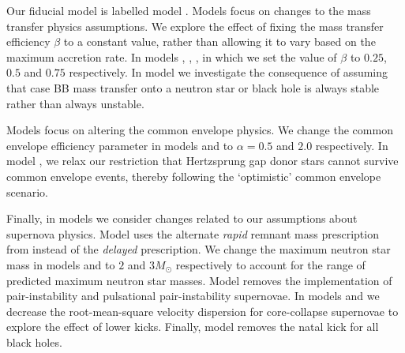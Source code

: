 Our fiducial model is labelled model \modFid{}. Models \modRangeMT{} focus on changes to the mass transfer physics assumptions. We explore the effect of fixing the mass transfer efficiency $\beta$ to a constant value, rather than allowing it to vary based on the maximum accretion rate. In models \modBetaLow{}, \modBetaMed{}, \modBetaHigh{}, in which we set the value of $\beta$ to $0.25$, $0.5$ and $0.75$ respectively. In model \modCaseBB{} we investigate the consequence of assuming that case BB mass transfer onto a neutron star or black hole is always stable rather than always unstable.

Models \modRangeCE{} focus on altering the common envelope physics. We change the common envelope efficiency parameter in models \modAlphaLow{} and \modAlphaHigh{} to $\alpha = 0.5$ and $2.0$ respectively. In model \modOpt, we relax our restriction that Hertzsprung gap donor stars cannot survive common envelope events, thereby following the `optimistic' common envelope scenario.

Finally, in models \modRangeSN{} we consider changes related to our assumptions about supernova physics. Model \modRapid{} uses the alternate \textit{rapid} remnant mass prescription from \citet{Fryer+2012} instead of the \textit{delayed} prescription. We change the maximum neutron star mass in models \modNSLow{} and \modNSHigh{} to $2$ and $3 \unit{M_{\odot}}$ respectively to account for the range of predicted maximum neutron star masses. Model \modNoPISN{} removes the implementation of pair-instability and pulsational pair-instability supernovae. In models \modSigLow{} and \modSigLower{} we decrease the root-mean-square velocity dispersion for core-collapse supernovae to explore the effect of lower kicks. Finally, model \modNoBH{} removes the natal kick for all black holes.

